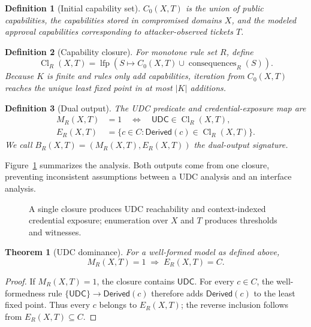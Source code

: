 \documentclass[preprint,12pt]{elsarticle}
\newtheorem{definition}{Definition}
\newtheorem{theorem}{Theorem}
\newcommand{\Cl}{\operatorname{Cl}}
\newcommand{\UDC}{\mathsf{UDC}}
\newcommand{\Derived}{\mathsf{Derived}}
\begin{document}
\begin{definition}[Initial capability set]
$C_0(X,T)$ is the union of public capabilities, the capabilities stored in
compromised domains $X$, and the modeled approval capabilities corresponding
to attacker-observed tickets $T$.
\end{definition}

\begin{definition}[Capability closure]
For monotone rule set $R$, define
\begin{equation}
\Cl_R(X,T)=\operatorname{lfp}
\left(S\mapsto C_0(X,T)\cup\operatorname{consequences}_R(S)\right).
\label{eq:closure}
\end{equation}
Because $K$ is finite and rules only add capabilities, iteration from
$C_0(X,T)$ reaches the unique least fixed point in at most $|K|$ additions.
\end{definition}

\begin{definition}[Dual output]
The UDC predicate and credential-exposure map are
\begin{align}
M_R(X,T)&=1 \quad\Longleftrightarrow\quad \UDC\in\Cl_R(X,T),\\
E_R(X,T)&=\{c\in C:\Derived(c)\in\Cl_R(X,T)\}.
\end{align}
We call $B_R(X,T)=(M_R(X,T),E_R(X,T))$ the dual-output signature.
\end{definition}

Figure~\ref{fig:pipeline} summarizes the analysis.  Both outputs come from one
closure, preventing inconsistent assumptions between a UDC analysis and an
interface analysis.

\begin{figure}[t]
\centering

\caption{A single closure produces UDC reachability and context-indexed
credential exposure; enumeration over $X$ and $T$ produces thresholds and
witnesses.}
\label{fig:pipeline}
\end{figure}

\begin{theorem}[UDC dominance]
\label{thm:root-dominance}
For a well-formed model as defined above,
\[
M_R(X,T)=1\;\Longrightarrow\;E_R(X,T)=C.
\]
\end{theorem}

\begin{proof}
If $M_R(X,T)=1$, the closure contains $\UDC$.  For every $c\in C$, the
well-formedness rule $\{\UDC\}\rightarrow\Derived(c)$ therefore adds
$\Derived(c)$ to the least fixed point.  Thus every $c$ belongs to $E_R(X,T)$;
the reverse inclusion follows from $E_R(X,T)\subseteq C$.
\end{proof}
\end{document}
